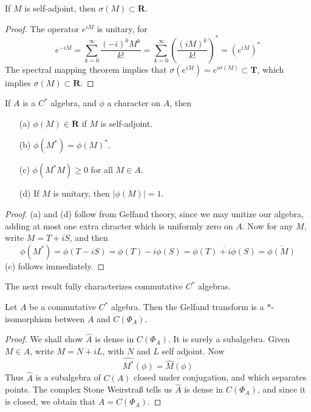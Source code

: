 \begin{prop}
    If $M$ is self-adjoint, then $\sigma(M) \subset \mathbf{R}$.
\end{prop}
\begin{proof}
    The operator $e^{iM}$ is unitary, for
    \[ e^{-iM} = \sum_{k = 0}^\infty \frac{(-i)^k M^k}{k!} = \sum_{k = 0}^\infty \left( \frac{(iM)^k}{k!} \right)^* = (e^{iM})^* \]
    The spectral mapping theorem implies that $\sigma(e^{iM}) = e^{i \sigma(M)} \subset \mathbf{T}$, which implies $\sigma(M) \subset \mathbf{R}$.
\end{proof}

\begin{prop}
    If $A$ is a $C^*$ algebra, and $\phi$ a character on $A$, then
    \begin{enumerate}
        \item[(a)] $\phi(M) \in \mathbf{R}$ if $M$ is self-adjoint.
        \item[(b)] $\phi(M^*) = \phi(M)^*$.
        \item[(c)] $\phi(M^*M) \geq 0$ for all $M \in A$.
        \item[(d)] If $M$ is unitary, then $|\phi(M)| = 1$.
    \end{enumerate}
\end{prop}
\begin{proof}
    (a) and (d) follow from Gelfand theory, since we may unitize our algebra, adding at most one extra chracter which is uniformly zero on $A$. Now for any $M$, write $M = T + iS$, and then
    \[ \phi(M^*) = \phi(T - iS) = \phi(T) - i \phi(S) = \overline{\phi(T) + i \phi(S)} = \overline{\phi(M)} \]
    (c) follows immediately.
\end{proof}

The next result fully characterizes commutative $C^*$ algebras.

\begin{theorem}
    Let $A$ be a commutative $C^*$ algebra. Then the Gelfand transform is a $*$-isomorphism between $A$ and $C(\Phi_A)$.
\end{theorem}
\begin{proof}
    We shall show $\hat{A}$ is dense in $C(\Phi_A)$. It is surely a subalgebra. Given $M \in A$, write $M = N + iL$, with $N$ and $L$ self adjoint. Now
    \[ \widehat{M^*}(\phi) = \overline{\widehat{M}(\phi)} \]
    Thus $\widehat{A}$ is a subalgebra of $C(A)$ closed under conjugation, and which separates points. The complex Stone Weirstra{\ss} tells us $\widehat{A}$ is dense in $C(\Phi_A)$, and since it is closed, we obtain that $\widehat{A} = C(\Phi_A)$.
\end{proof}

